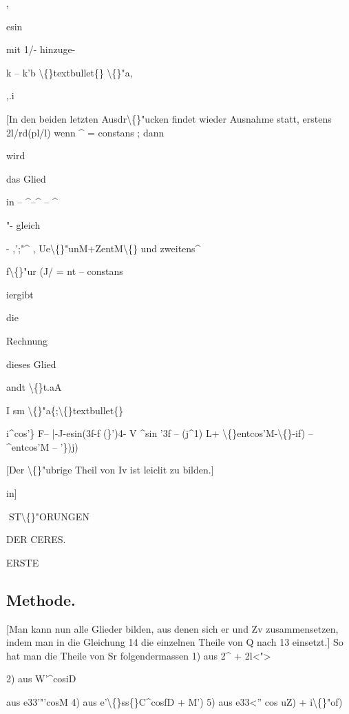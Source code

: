 \documentclass[10pt,a4paper]{article}
\begin{document}
,

esin

mit 1/- hinzuge-

k -- k'b \textbackslash\{\}textbullet\{\} \textbackslash\{\}"a,

,.i

[In den beiden letzten Ausdr\textbackslash\{\}"ucken findet wieder
Ausnahme statt, erstens
2l/rd(pl/l)
wenn \textasciicircum{} = constans ; dann

wird

das Glied

in -- \textasciicircum{}--\textasciicircum{} -- \textasciicircum{}

"- gleich

- ,';"\textasciicircum{} , Ue\textbackslash\{\}"unM+ZentM\textbackslash\{\}
und zweitens\textasciicircum{}

f\textbackslash\{\}"ur (J/ = nt -- constans

iergibt

die

Rechnung

dieses Glied

andt
\textbackslash\{\}t.aA

I sm \textbackslash\{\}"a\{;\textbackslash\{\}textbullet\{\}

i\textasciicircum{}cos'\} F-- |-J-esin(3f-f (\}')4- V \textasciicircum{}sin '3f -- (j\textasciicircum{}1)
L+ \textbackslash\{\}entcos'M-\textbackslash\{\}-if) -- \textasciicircum{}entcos'M -- '\})j)

[Der \textbackslash\{\}"ubrige Theil von Iv ist leiclit zu bilden.]

in]

\newpage
ST\textbackslash\{\}"ORUNGEN

DER CERES.

ERSTE

\subsection*{Methode.}


[Man kann nun alle Glieder bilden, aus denen sich er und Zv zusammensetzen, indem man in die Gleichung 14 die einzelnen Theile von Q nach 13
einsetzt.]
So hat man die Theile von Sr folgendermassen
1) aus 2\textasciicircum{} + 2l<">

2) aus W'\textasciicircum{}cosiD

aus e33'"'cosM
4) aus e'\textbackslash\{\}ss\{\}C\textasciicircum{}cosfD + M')
5) aus e33<'' cos uZ) + i\textbackslash\{\}"of)
\end{document}
